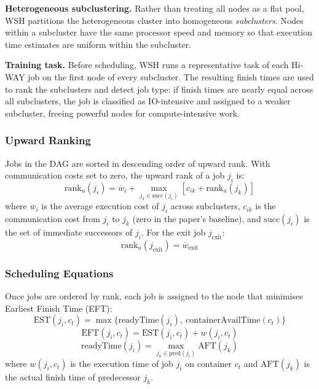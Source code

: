 \documentclass[12pt,a4paper]{article}
\begin{document}
\textbf{Heterogeneous subclustering.} Rather than treating all nodes as a flat pool, WSH partitions the heterogeneous cluster into homogeneous \textit{subclusters}. Nodes within a subcluster have the same processor speed and memory so that execution time estimates are uniform within the subcluster.

\textbf{Training task.} Before scheduling, WSH runs a representative task of each Hi-WAY job on the first node of every subcluster. The resulting finish times are used to rank the subclusters and detect job type: if finish times are nearly equal across all subclusters, the job is classified as IO-intensive and assigned to a weaker subcluster, freeing powerful nodes for compute-intensive work.

\subsubsection{Upward Ranking}
Jobs in the DAG are sorted in descending order of upward rank. With communication costs set to zero, the upward rank of a job $j_i$ is:
\begin{equation}
    \text{rank}_u(j_i) = \overline{w}_i + \max_{j_k \in \text{succ}(j_i)} \left[ c_{ik} + \text{rank}_u(j_k) \right]
    \label{eq:upward_rank}
\end{equation}
where $\overline{w}_i$ is the average execution cost of $j_i$ across subclusters, $c_{ik}$ is the communication cost from $j_i$ to $j_k$ (zero in the paper's baseline), and $\text{succ}(j_i)$ is the set of immediate successors of $j_i$. For the exit job $j_{\text{exit}}$:
\begin{equation}
    \text{rank}_u(j_{\text{exit}}) = \overline{w}_{\text{exit}}
    \label{eq:exit_rank}
\end{equation}

\subsubsection{Scheduling Equations}
Once jobs are ordered by rank, each job is assigned to the node that minimises Earliest Finish Time (EFT):
\begin{equation}
    \text{EST}(j_i, c_t) = \max \{ \text{readyTime}(j_i),\ \text{containerAvailTime}(c_t) \}
    \label{eq:est}
\end{equation}
\begin{equation}
    \text{EFT}(j_i, c_t) = \text{EST}(j_i, c_t) + w(j_i, c_t)
    \label{eq:eft}
\end{equation}
\begin{equation}
    \text{readyTime}(j_i) = \max_{j_k \in \text{pred}(j_i)} \text{AFT}(j_k)
    \label{eq:ready}
\end{equation}
where $w(j_i, c_t)$ is the execution time of job $j_i$ on container $c_t$ and $\text{AFT}(j_k)$ is the actual finish time of predecessor $j_k$.
\end{document}
